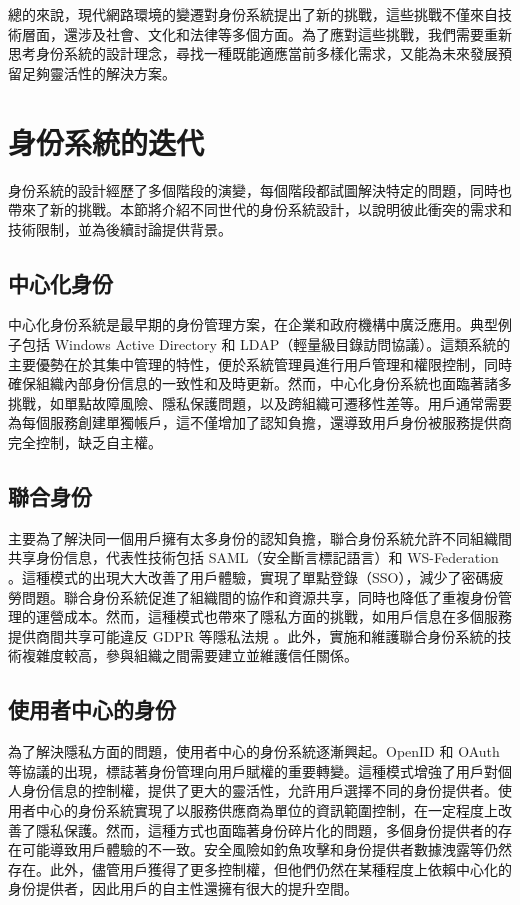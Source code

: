 總的來說，現代網路環境的變遷對身份系統提出了新的挑戰，這些挑戰不僅來自技術層面，還涉及社會、文化和法律等多個方面。為了應對這些挑戰，我們需要重新思考身份系統的設計理念，尋找一種既能適應當前多樣化需求，又能為未來發展預留足夠靈活性的解決方案。
\section{身份系統的迭代}
身份系統的設計經歷了多個階段的演變，每個階段都試圖解決特定的問題，同時也帶來了新的挑戰。本節將介紹不同世代的身份系統設計，以說明彼此衝突的需求和技術限制，並為後續討論提供背景。
\subsection{中心化身份}
中心化身份系統是最早期的身份管理方案，在企業和政府機構中廣泛應用。典型例子包括 Windows Active Directory 和 LDAP（輕量級目錄訪問協議）\cite{microsoft2021active, sermersheim2006lightweight}。這類系統的主要優勢在於其集中管理的特性，便於系統管理員進行用戶管理和權限控制，同時確保組織內部身份信息的一致性和及時更新。然而，中心化身份系統也面臨著諸多挑戰，如單點故障風險、隱私保護問題，以及跨組織可遷移性差等。用戶通常需要為每個服務創建單獨帳戶，這不僅增加了認知負擔\cite{josang2007security}，還導致用戶身份被服務提供商完全控制，缺乏自主權。
\subsection{聯合身份}
主要為了解決同一個用戶擁有太多身份的認知負擔，聯合身份系統允許不同組織間共享身份信息，代表性技術包括 SAML（安全斷言標記語言）和 WS-Federation \cite{oasis2005security, goodner2009web}。這種模式的出現大大改善了用戶體驗，實現了單點登錄（SSO），減少了密碼疲勞問題。聯合身份系統促進了組織間的協作和資源共享，同時也降低了重複身份管理的運營成本。然而，這種模式也帶來了隱私方面的挑戰\cite{ahn2007user}，如用戶信息在多個服務提供商間共享可能違反 GDPR 等隱私法規 \cite{GDPR2016}。此外，實施和維護聯合身份系統的技術複雜度較高，參與組織之間需要建立並維護信任關係。
\subsection{使用者中心的身份}
為了解決隱私方面的問題，使用者中心的身份系統逐漸興起。OpenID 和 OAuth 等協議的出現\cite{sakimura2014openid, hardt2012oauth}，標誌著身份管理向用戶賦權的重要轉變。這種模式增強了用戶對個人身份信息的控制權，提供了更大的靈活性，允許用戶選擇不同的身份提供者。使用者中心的身份系統實現了以服務供應商為單位的資訊範圍控制，在一定程度上改善了隱私保護。然而，這種方式也面臨著身份碎片化的問題，多個身份提供者的存在可能導致用戶體驗的不一致。安全風險如釣魚攻擊和身份提供者數據洩露等仍然存在\cite{sun2012devil}。此外，儘管用戶獲得了更多控制權，但他們仍然在某種程度上依賴中心化的身份提供者，因此用戶的自主性還擁有很大的提升空間\cite{allen2016selfsovereign}。
